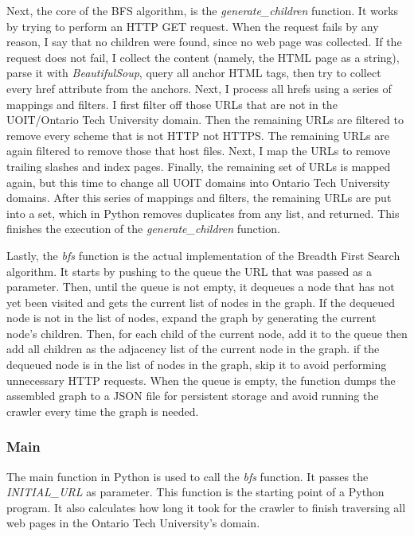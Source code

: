Next, the core of the BFS algorithm, is the \textit{generate\_children} function. It works by trying to perform an HTTP GET request. When the request fails by any reason, I say that no children were found, since no web page was collected. If the request does not fail, I collect the content (namely, the HTML page as a string), parse it with \textit{BeautifulSoup}, query all anchor HTML tags, then try to collect every href attribute from the anchors. Next, I process all hrefs using a series of mappings and filters. I first filter off those URLs that are not in the UOIT/Ontario Tech University domain. Then the remaining URLs are filtered to remove every scheme that is not HTTP not HTTPS. The remaining URLs are again filtered to remove those that host files. Next, I map the URLs to remove trailing slashes and index pages. Finally, the remaining set of URLs is mapped again, but this time to change all UOIT domains into Ontario Tech University domains. After this series of mappings and filters, the remaining URLs are put into a set, which in Python removes duplicates from any list, and returned. This finishes the execution of the \textit{generate\_children} function.

Lastly, the \textit{bfs} function is the actual implementation of the Breadth First Search algorithm. It starts by pushing to the queue the URL that was passed as a parameter. Then, until the queue is not empty, it dequeues a node that has not yet been visited and gets the current list of nodes in the graph. If the dequeued node is not in the list of nodes, expand the graph by generating the current node's children. Then, for each child of the current node, add it to the queue then add all children as the adjacency list of the current node in the graph. if the dequeued node is in the list of nodes in the graph, skip it to avoid performing unnecessary HTTP requests. When the queue is empty, the function dumps the assembled graph to a JSON file for persistent storage and avoid running the crawler every time the graph is needed.

\subsubsection{Main}
The main function in Python is used to call the \textit{bfs} function. It passes the \textit{INITIAL\_URL} as parameter. This function is the starting point of a Python program. It also calculates how long it took for the crawler to finish traversing all web pages in the Ontario Tech University's domain.